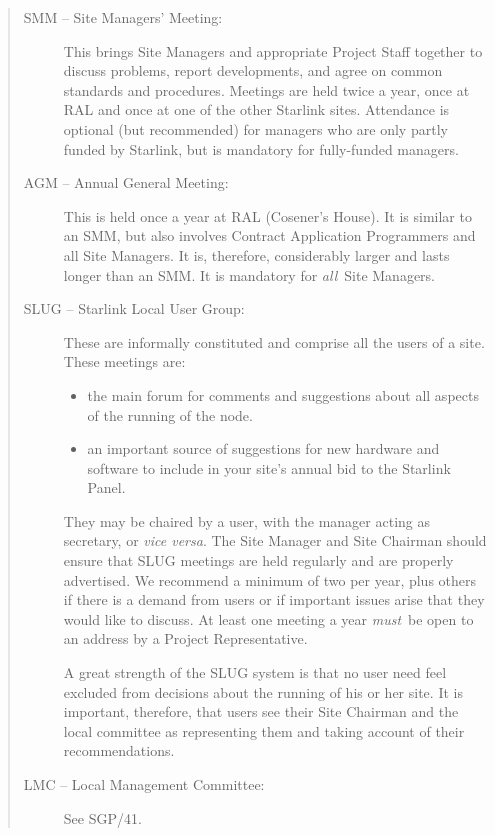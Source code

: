 \documentclass[twoside,11pt]{article}
\newcommand{\xref}[3]{#1}
\begin{document}
\begin{quote}
\begin{description}
\item [SMM -- Site Managers' Meeting:]
 This brings Site Managers and appropriate Project Staff together to discuss
 problems, report  developments, and agree on common standards and procedures.
 Meetings are held twice a year, once at RAL and once at one of the other
 Starlink sites.
 Attendance is optional (but recommended) for managers who are only partly
 funded by Starlink, but is mandatory for fully-funded managers.
\item [AGM -- Annual General Meeting:]
 This is held once a year at RAL (Cosener's House).
 It is similar to an SMM, but also involves Contract Application Programmers and
 all Site Managers. 
 It is, therefore, considerably larger and lasts longer than an SMM.
 It is mandatory for {\em all}\, Site Managers.
\item [SLUG -- Starlink Local User Group:]
 These are informally constituted and comprise all the users of a site.
 These meetings are:
 \begin{itemize}
 \item the main forum for comments and suggestions about all aspects of the
  running of the node.
 \item an important source of suggestions for new hardware and software to
  include in your site's annual bid to the Starlink Panel.
 \end{itemize}
 They may be chaired by a user, with the manager acting as secretary, or
 {\it vice versa}.
 The Site Manager and Site Chairman should ensure that SLUG meetings are held
 regularly and are properly advertised.
 We recommend a minimum of two per year, plus others if there is a demand from
 users or if important issues arise that they would like to discuss.
 At least one meeting a year {\em must}\, be open to an address by a Project
 Representative.
 
 A great strength of the SLUG system is that no user need feel excluded from
 decisions about the running of his or her site.
 It is important, therefore, that users see their Site Chairman and the local
 committee as representing them and taking account of their recommendations.

\item [LMC -- Local Management Committee:]
 See \xref{SGP/41}{sgp41}{}.
\end{description}
\end{quote}
\end{document}
